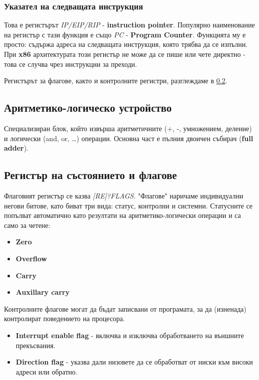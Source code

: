 \documentclass[fleqn,12pt]{article}
\begin{document}
\subsubsection{Указател на следващата инструкция}
Това е регистърът \textit{IP/EIP/RIP} - \textbf{instruction pointer}. Популярно наименование на регистър с тази функция е също 
\textit{PC} - \textbf{Program Counter}. Функцията му е просто: съдържа адреса на следващата инструкция, която трябва да се изпълни.
При \textbf{x86} архитектурата този регистър не може да се пише или чете директно - това се случва чрез инструкции за преходи.

Регистърът за флагове, както и контролните регистри, разглеждаме в \ref{section:flags}.

\subsection{Аритметико-логическо устройство}
Специализиран блок, който извърша аритметичните (+, -, умножением, деление) и логически (and, or, \dots) операции. Основна част е пълния двоичен събирач (\textbf{full adder}).

\subsection{Регистър на състоянието и флагове}
\label{section:flags}
Флаговият регистър се казва \textit{[RE]?FLAGS}. "Флагове" наричаме индивидуални негови битове, като биват три вида: статус, контролни и системни.
Статусните се попълват автоматично като резултати на аритметико-логически операции и са само за четене:
\begin{itemize}
    \item \textbf{Zero}
    \item \textbf{Overflow}
    \item \textbf{Carry}
    \item \textbf{Auxillary carry}
\end{itemize}

Контролните флагове могат да бъдат записвани от програмата, за да (изненада) контролират поведението на процесора.
\begin{itemize}
    \item \textbf{Interrupt enable flag} - включва и изключва обработването на външните прекъсвания.
    \item \textbf{Direction flag} - указва дали низовете да се обработват от ниски към високи адреси или обратно.
\end{itemize}
\end{document}
